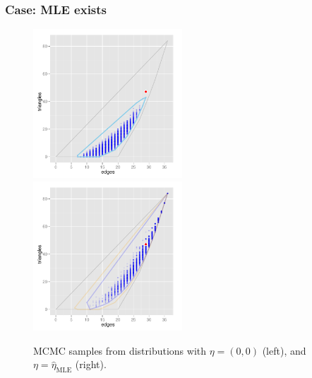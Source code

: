 \documentclass[ 10pt]{beamer}
\newcommand{\etaMLE}{\hat{\eta}_{\textrm{MLE}}}
\begin{document}
\frame
{
\frametitle{Case: MLE exists}  
\begin{figure}[h]
\centering
\includegraphics[height=2.2in]{MCsample-far}
\includegraphics[height=2.2in]{MCsample-MLE}
\caption{MCMC samples from distributions with $\eta = (0,0)$ (left), and $\eta=\etaMLE$ (right).}
\label{F:MCsample-MLE exists}
\end{figure}
}
\end{document}
